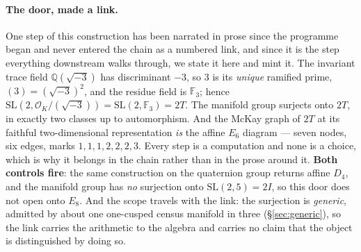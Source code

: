 \documentclass[11pt,a4paper]{article}
\theoremstyle{definition}
\theoremstyle{remark}
\newcommand{\Q}{\mathbb{Q}}
\begin{document}
\paragraph{The door, made a link.} One step of this construction has been narrated in prose since the
programme began and never entered the chain as a numbered link, and since it is the step everything downstream walks
through, we state it here and mint it. The invariant trace field $\Q(\sqrt{-3})$ has discriminant $-3$, so $3$ is its
\emph{unique} ramified prime, $(3) = (\sqrt{-3})^2$, and the residue field is $\mathbb{F}_3$; hence
$\mathrm{SL}(2, \mathcal O_K/(\sqrt{-3})) = \mathrm{SL}(2,\mathbb{F}_3) = 2T$. The manifold group surjects onto $2T$, in exactly
two classes up to automorphism. And the McKay graph of $2T$ at its faithful two-dimensional representation \emph{is} the
affine $E_6$ diagram --- seven nodes, six edges, marks $1,1,1,2,2,2,3$. Every step is a computation and none is a choice,
which is why it belongs in the chain rather than in the prose around it. \textbf{Both controls fire}: the same
construction on the quaternion group returns affine $D_4$, and the manifold group has \emph{no} surjection onto
$\mathrm{SL}(2,5) = 2I$, so this door does not open onto $E_8$. And the scope travels with the link: the surjection is
\emph{generic}, admitted by about one one-cusped census manifold in three (\S\ref{sec:generic}), so the link carries the
arithmetic to the algebra and carries no claim that the object is distinguished by doing so.
\end{document}
